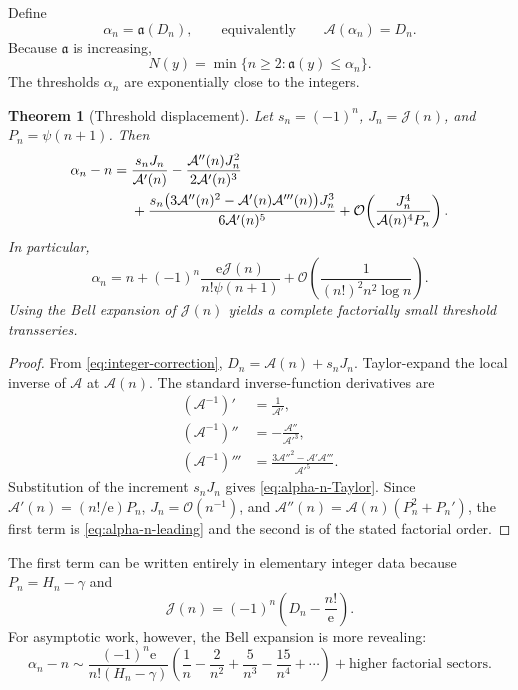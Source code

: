 \documentclass[11pt,a4paper]{article}
\numberwithin{equation}{section}
\newtheorem{theorem}{Theorem}[section]
\theoremstyle{definition}
\theoremstyle{remark}
\newcommand{\e}{\mathrm e}
\newcommand{\Ord}{\mathcal O}
\newcommand{\Core}{\mathcal A}
\newcommand{\Tail}{\mathcal J}
\newcommand{\InvCore}{\mathfrak a}
\begin{document}
Define
\begin{equation}\label{eq:alpha-n-def}
 \alpha_n=\InvCore(D_n),
 \qquad\text{equivalently}\qquad
 \Core(\alpha_n)=D_n.
\end{equation}
Because $\InvCore$ is increasing,
\begin{equation}\label{eq:N-threshold}
 \boxed{\quad
 N(y)=\min\{n\ge2:\InvCore(y)\le\alpha_n\}.
 \quad}
\end{equation}
The thresholds $\alpha_n$ are exponentially close to the integers.

\begin{theorem}[Threshold displacement]\label{thm:threshold-displacement}
Let $s_n=(-1)^n$, $J_n=\Tail(n)$, and $P_n=\psi(n+1)$.  Then
\begin{align}
 \alpha_n-n={}&
 \frac{s_nJ_n}{\Core'(n)}
 -\frac{\Core''(n)J_n^2}{2\Core'(n)^3}\notag\\
 &+\frac{s_n\bigl(3\Core''(n)^2-\Core'(n)\Core'''(n)\bigr)J_n^3}
 {6\Core'(n)^5}
 +\Ord\!\left(\frac{J_n^4}{\Core(n)^4P_n}\right).
 \label{eq:alpha-n-Taylor}
\end{align}
In particular,
\begin{equation}\label{eq:alpha-n-leading}
 \boxed{\quad
 \alpha_n=n+(-1)^n
 \frac{\e\Tail(n)}{n!\psi(n+1)}
 +\Ord\!\left(\frac1{(n!)^2n^2\log n}\right).
 \quad}
\end{equation}
Using the Bell expansion of $\Tail(n)$ yields a complete factorially small
threshold transseries.
\end{theorem}

\begin{proof}
From \eqref{eq:integer-correction},
$D_n=\Core(n)+s_nJ_n$.  Taylor-expand the local inverse of $\Core$ at
$\Core(n)$.  The standard inverse-function derivatives are
\begin{align*}
 (\Core^{-1})'&=\frac1{\Core'},\\
 (\Core^{-1})''&=-\frac{\Core''}{\Core'^3},\\
 (\Core^{-1})'''&=\frac{3\Core''^2-\Core'\Core'''}{\Core'^5}.
\end{align*}
Substitution of the increment $s_nJ_n$ gives
\eqref{eq:alpha-n-Taylor}.  Since
$\Core'(n)=(n!/\e)P_n$, $J_n=\Ord(n^{-1})$, and
$\Core''(n)=\Core(n)(P_n^2+P_n')$, the first term is
\eqref{eq:alpha-n-leading} and the second is of the stated factorial order.
\end{proof}

The first term can be written entirely in elementary integer data because
$P_n=H_n-\gamma$ and
\begin{equation}\label{eq:J-n-exact}
 \Tail(n)=(-1)^n\left(D_n-\frac{n!}{\e}\right).
\end{equation}
For asymptotic work, however, the Bell expansion is more revealing:
\begin{equation}\label{eq:alpha-n-Bell}
 \alpha_n-n\sim
 \frac{(-1)^n\e}{n!(H_n-\gamma)}
 \left(\frac1n-\frac2{n^2}+\frac5{n^3}-\frac{15}{n^4}+\cdots\right)
 +\text{higher factorial sectors}.
\end{equation}
\end{document}
